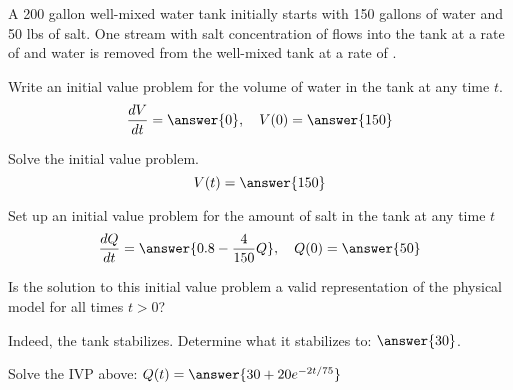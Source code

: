 \documentclass{ximera}
\begin{document}

\begin{exercise}
    A 200 gallon well-mixed water tank initially starts with 150 gallons of water and 50 lbs of salt. One stream with salt concentration of  flows into the tank at a rate of  and water is removed from the well-mixed tank at a rate of .

    Write an initial value problem for the volume of water in the tank at any time $t$.
    \[
        \frac{dV}{dt} = \answer{0}, \quad V(0) = \answer{150}
    \]
    \begin{problem}
        Solve the initial value problem.
        \[
            V(t) = \answer{150} 
        \]
        \begin{problem}
            Set up an initial value problem for the amount of salt in the tank at any time $t$
            \[
                \frac{dQ}{dt} = \answer{0.8 - \frac{4}{150}Q}, \quad Q(0) = \answer{50}
            \]
            \begin{problem}
                Is the solution to this initial value problem a valid representation of the physical model for all times $t > 0$?
                \begin{multipleChoice}
                \end{multipleChoice}
                \begin{problem}
                    Indeed, the tank stabilizes. Determine what it stabilizes to: $\answer{30}$.
                    \begin{problem}
                        Solve the IVP above: $Q(t) = \answer{30 + 20e^{-2t/75}}$
                    \end{problem}
                \end{problem}
            \end{problem}
        \end{problem}
    \end{problem}
\end{exercise}
\end{document}
